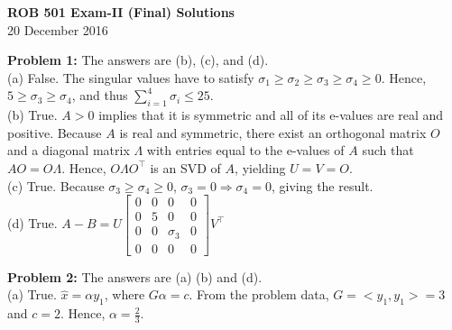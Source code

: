 \documentclass[letterpaper]{article}
\begin{document}
\newcommand{\trace}{\mathrm{trace}}
\newcommand{\real}{\mathbb R}  %
\newcommand{\nat}{\mathbb R}   %
\newcommand{\cp}{\mathbb C}    %
\newcommand{\ds}{\displaystyle}
\newcommand{\mf}[2]{\frac{\ds #1}{\ds #2}}
\newcommand{\book}[2]{{Luenberger, Page~#1, }{Prob.~#2}}
\newcommand{\spanof}[1]{\textrm{span} \{ #1 \}}
 \newcommand{\cov}{\mathrm{cov}}
 \newcommand{\E}{\mathcal{E}}
\parindent 0pt


\begin{center}
{\large \bf ROB 501 Exam-II (Final) Solutions}\\
20 December 2016
\end{center}

\vspace*{1cm}

\noindent \textbf{Problem 1:} The answers are (b), (c), and (d). \\

(a) False. The singular values have to satisfy $\sigma_1 \ge \sigma_2 \ge \sigma_3 \ge \sigma_4 \ge 0.$ Hence, $5\ge \sigma_3 \ge \sigma_4$, and thus $\sum_{i=1}^{4} \sigma_i \le 25.$\\

(b) True. $A>0$ implies that it is symmetric and all of its e-values are real and positive. Because $A$ is real and symmetric, there exist an orthogonal matrix $O$ and a diagonal matrix $\Lambda$ with entries equal to the e-values of $A$ such that $A O = O \Lambda$. Hence, $O \Lambda  O^\top$ is an SVD of $A$, yielding $U=V=O$.\\

(c) True. Because $\sigma_3 \ge \sigma_4 \ge 0$, $\sigma_3=0 \Rightarrow \sigma_4=0$, giving the result.\\

(d) True.  $A-B=U\left[ \begin{array}{cccc} 0 & 0 &0 &0 \\ 0 & 5 & 0 & 0\\ 0 & 0 & \sigma_3 & 0 \\ 0 & 0 & 0 & 0 \end{array} \right] V^\top$
\vspace*{1cm}

\noindent \textbf{Problem 2:} The answers are (a) (b) and (d). \\

(a) True. $\hat{x}=\alpha y_1$, where $G \alpha = c$. From the problem data, $G=<y_1,y_1> =3$ and $c=2$. Hence, $\alpha = \frac{2}{3}$.\\
\end{document}
